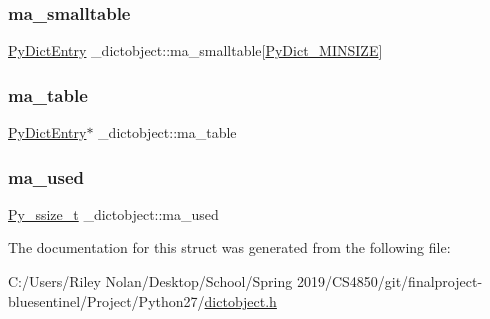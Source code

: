 \mbox{\label{struct__dictobject_abc4c0213e2b6c67fc654cebe6b9ab686}} 
\subsubsection{\texorpdfstring{ma\_smalltable}{ma\_smalltable}}
{\footnotesize\ttfamily \mbox{\hyperlink{struct_py_dict_entry}{Py\+Dict\+Entry}} \+\_\+dictobject\+::ma\+\_\+smalltable\mbox{[}\mbox{\hyperlink{dictobject_8h_ad0903eadb039a5ea8dc7654f85d752c5}{Py\+Dict\+\_\+\+M\+I\+N\+S\+I\+ZE}}\mbox{]}}

\mbox{\label{struct__dictobject_aca559ac97f4436a37fe06cf1ec2a1ffd}} 
\subsubsection{\texorpdfstring{ma\_table}{ma\_table}}
{\footnotesize\ttfamily \mbox{\hyperlink{struct_py_dict_entry}{Py\+Dict\+Entry}}$\ast$ \+\_\+dictobject\+::ma\+\_\+table}

\mbox{\label{struct__dictobject_a070eddaa8f3e0c0291746df1a7ae5c6a}} 
\subsubsection{\texorpdfstring{ma\_used}{ma\_used}}
{\footnotesize\ttfamily \mbox{\hyperlink{pyport_8h_ac6411a3dfda9ac6feb9e8d859b1184bc}{Py\+\_\+ssize\+\_\+t}} \+\_\+dictobject\+::ma\+\_\+used}



The documentation for this struct was generated from the following file\+:\begin{DoxyCompactItemize}
\item 
C\+:/\+Users/\+Riley Nolan/\+Desktop/\+School/\+Spring 2019/\+C\+S4850/git/finalproject-\/bluesentinel/\+Project/\+Python27/\mbox{\hyperlink{dictobject_8h}{dictobject.\+h}}\end{DoxyCompactItemize}
